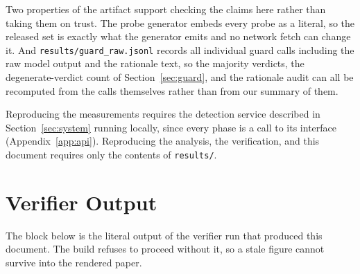 \documentclass[conference]{IEEEtran}
\begin{document}
Two properties of the artifact support checking the claims here rather than
taking them on trust. The probe generator embeds every probe as a literal, so
the released set is exactly what the generator emits and no network fetch can
change it. And \texttt{results/guard\_raw.jsonl} records all
\NGuardCalls{} individual guard calls including the raw model output and the
rationale text, so the majority verdicts, the degenerate-verdict count of
Section~\ref{sec:guard}, and the rationale audit can all be recomputed from the
calls themselves rather than from our summary of them.

Reproducing the measurements requires the detection service described in
Section~\ref{sec:system} running locally, since every phase is a call to its
interface (Appendix~\ref{app:api}). Reproducing the analysis, the verification,
and this document requires only the contents of \texttt{results/}.

\section{Verifier Output}\label{app:verify}

The block below is the literal output of the verifier run that produced this
document. The build refuses to proceed without it, so a stale figure cannot
survive into the rendered paper.


\end{document}
